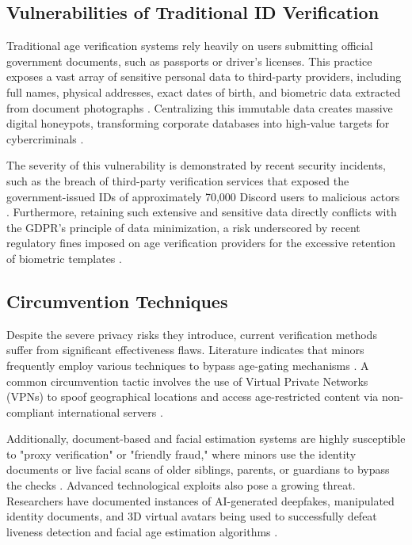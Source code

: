 \documentclass [english]{hogent-article}
\begin{document}
    
    
    \subsection{Vulnerabilities of Traditional ID Verification}
    
    Traditional age verification systems rely heavily on users submitting official government documents, such as passports or driver's licenses. This practice exposes a vast array of sensitive personal data to third-party providers, including full names, physical addresses, exact dates of birth, and biometric data extracted from document photographs \autocite{Alajaji2025, AdGuard2026}. Centralizing this immutable data creates massive digital honeypots, transforming corporate databases into high-value targets for cybercriminals \autocite{Newmark2026}. 
    
    The severity of this vulnerability is demonstrated by recent security incidents, such as the breach of third-party verification services that exposed the government-issued IDs of approximately 70,000 Discord users to malicious actors \autocite{Alajaji2025, EFF2025ZKP}. Furthermore, retaining such extensive and sensitive data directly conflicts with the GDPR's principle of data minimization, a risk underscored by recent regulatory fines imposed on age verification providers for the excessive retention of biometric templates \autocite{AdGuard2026}.
    
    
    
    \subsection{Circumvention Techniques}
    
    Despite the severe privacy risks they introduce, current verification methods suffer from significant effectiveness flaws. Literature indicates that minors frequently employ various techniques to bypass age-gating mechanisms \autocite{Wodo2025}. A common circumvention tactic involves the use of Virtual Private Networks (VPNs) to spoof geographical locations and access age-restricted content via non-compliant international servers \autocite{Wodo2025, Alajaji2025}. 
    
    
    
    Additionally, document-based and facial estimation systems are highly susceptible to "proxy verification" or "friendly fraud," where minors use the identity documents or live facial scans of older siblings, parents, or guardians to bypass the checks \autocite{Wodo2025}. Advanced technological exploits also pose a growing threat. Researchers have documented instances of AI-generated deepfakes, manipulated identity documents, and 3D virtual avatars being used to successfully defeat liveness detection and facial age estimation algorithms \autocite{Wodo2025}.
    
\end{document}
